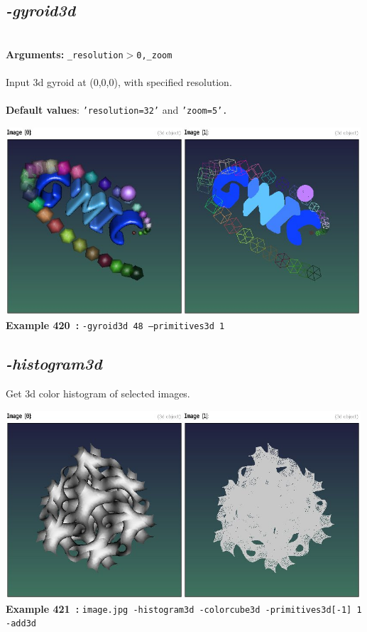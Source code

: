 \documentclass[a4paper,11pt,twoside]{book}
\begin{document}
\subsection{\emph{-gyroid3d} }\vspace*{-0.5em}
~\\\textbf{Arguments: } 
{\small \texttt{\_resolution$>$0,\_zoom}}\\~\\
Input 3d gyroid at (0,0,0), with specified resolution.
~\\~\\\textbf{Default values}: {\small \texttt{'resolution=32'} and \texttt{'zoom=5'.}}
\begin{center}\includegraphics[keepaspectratio=true,height=7cm,width=\textwidth]{img/gmic_def420.jpg}\\
{\footnotesize \textbf{Example 420~:} \texttt{-gyroid3d 48 --primitives3d 1}}
\end{center}

\subsection{\emph{-histogram3d} }\vspace*{-0.5em}
Get 3d color histogram of selected images.
\begin{center}\includegraphics[keepaspectratio=true,height=7cm,width=\textwidth]{img/gmic_def421.jpg}\\
{\footnotesize \textbf{Example 421~:} \texttt{image.jpg -histogram3d -colorcube3d -primitives3d[-1] 1 -add3d}}
\end{center}
\end{document}
